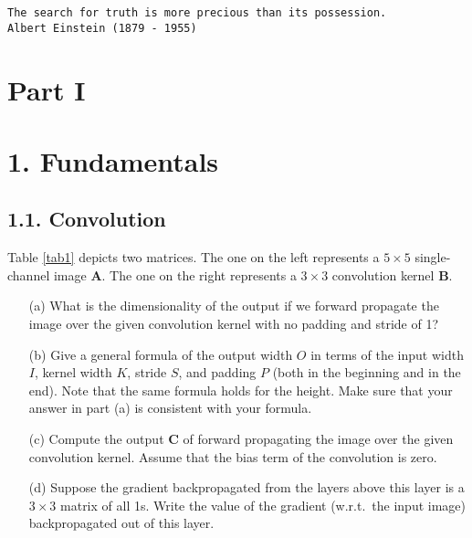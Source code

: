\documentclass[12pt,letterpaper]{article}
\newcommand{\matr}[1]{\bm{#1}}     %
\begin{document}
\begin{center}
\texttt{The search for truth is more precious than its possession.\\  Albert Einstein (1879 - 1955)}
\end{center}
\section*{\centering Part I}

\section*{1. Fundamentals}
\subsection*{1.1. Convolution}
Table \ref{tab1} depicts two matrices. The one on the left represents a $5\times 5$ single-channel image $\matr{A}$. The one on the right
 represents a $3\times 3$ convolution kernel $\matr{B}$. 
\begin{itemize}
    \item[(a)] What is the dimensionality of the output if we forward propagate the image over the given convolution kernel with no padding and stride of 1? 
    \item[(b)] Give a general formula of the output width $O$ in terms of the input width $I$, kernel width $K$, stride $S$, and padding $P$ (both in the beginning and in the end). Note that the same formula holds for the height. Make sure that your answer in part (a) is consistent with your formula. 
    \item[(c)] Compute the output $\matr{C}$ of forward propagating the image over the
given convolution kernel. Assume that the bias term of the convolution is zero.
    \item[(d)] Suppose the gradient backpropagated from the layers above this layer is a $3\times 3$ matrix of all 1s. Write the value of the gradient (w.r.t.~the input image) backpropagated out of this layer.
\end{itemize}
 
\end{document}

